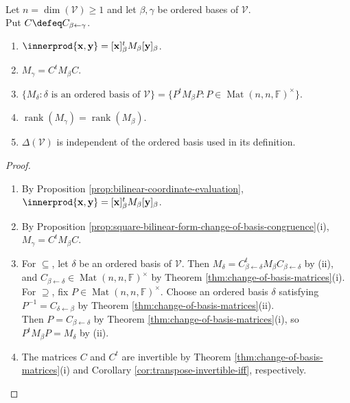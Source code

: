 \begin{proposition} \label{prop:metric-form-matrix-recovery-and-congruence} \\
Let $n=\dim(\mathcal{V})\geq1$ and let $\beta,\gamma$ be ordered bases of $\mathcal{V}$.\\
Put $C\defeq C_{\beta\leftarrow\gamma}$.
\begin{enumerate}[label=(\roman*)]
\setlength{\itemsep}{0pt}
\item $\innerprod{\mathbf{x},\mathbf{y}}=[\mathbf{x}]_{\beta}^{t}M_{\beta}[\mathbf{y}]_{\beta}$.
\item $M_{\gamma}=C^tM_{\beta}C$.
\item $\{M_{\delta}:\delta\text{ is an ordered basis of }\mathcal{V}\}=\{P^tM_{\beta}P:P\in\operatorname{Mat}(n,n,\mathbb{F})^{\times}\}$.
\item $\operatorname{rank}(M_{\gamma})=\operatorname{rank}(M_{\beta})$.
\item $\Delta(\mathcal{V})$ is independent of the ordered basis used in its definition.
\end{enumerate}
\begin{proof}
\begin{enumerate}[label=(\roman*)]
\setlength{\itemsep}{0pt}
\item[$(i)$] By Proposition \ref{prop:bilinear-coordinate-evaluation}, $\innerprod{\mathbf{x},\mathbf{y}}=[\mathbf{x}]_{\beta}^{t}M_{\beta}[\mathbf{y}]_{\beta}$.
\item[$(ii)$] By Proposition \ref{prop:square-bilinear-form-change-of-basis-congruence}(i), $M_{\gamma}=C^tM_{\beta}C$.
\item[$(iii)$] For $\subseteq$, let $\delta$ be an ordered basis of $\mathcal{V}$. Then $M_{\delta}=C_{\beta\leftarrow\delta}^tM_{\beta}C_{\beta\leftarrow\delta}$ by (ii), and $C_{\beta\leftarrow\delta}\in\operatorname{Mat}(n,n,\mathbb{F})^{\times}$ by Theorem \ref{thm:change-of-basis-matrices}(i).\\
For $\supseteq$, fix $P\in\operatorname{Mat}(n,n,\mathbb{F})^{\times}$. Choose an ordered basis $\delta$ satisfying $P^{-1}=C_{\delta\leftarrow\beta}$ by Theorem \ref{thm:change-of-basis-matrices}(ii).\\
Then $P=C_{\beta\leftarrow\delta}$ by Theorem \ref{thm:change-of-basis-matrices}(i), so $P^tM_{\beta}P=M_{\delta}$ by (ii).
\item[$(iv)$] The matrices $C$ and $C^t$ are invertible by Theorem \ref{thm:change-of-basis-matrices}(i) and Corollary \ref{cor:transpose-invertible-iff}, respectively.\\

\end{enumerate}
\end{proof}
\end{proposition}
